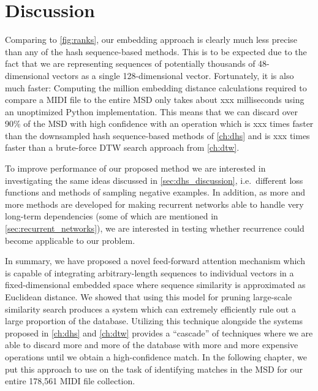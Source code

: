 \section{Discussion}
\label{sec:pse_discussion}

Comparing to \cref{fig:ranks}, our embedding approach is clearly much less precise than any of the hash sequence-based methods.
This is to be expected due to the fact that we are representing sequences of potentially thousands of 48-dimensional vectors as a single 128-dimensional vector.
Fortunately, it is also much faster: Computing the million embedding distance calculations required to compare a MIDI file to the entire MSD only takes about xxx milliseconds using an unoptimized Python implementation.
This means that we can discard over 90\% of the MSD with high confidence with an operation which is xxx times faster than the downsampled hash sequence-based methods of \cref{ch:dhs} and is xxx times faster than a brute-force DTW search approach from \cref{ch:dtw}.

To improve performance of our proposed method we are interested in investigating the same ideas discussed in \cref{sec:dhs_discussion}, i.e.\ different loss functions and methods of sampling negative examples.
In addition, as more and more methods are developed for making recurrent networks able to handle very long-term dependencies (some of which are mentioned in \cref{sec:recurrent_networks}), we are interested in testing whether recurrence could become applicable to our problem.

In summary, we have proposed a novel feed-forward attention mechanism which is capable of integrating arbitrary-length sequences to individual vectors in a fixed-dimensional embedded space where sequence similarity is approximated as Euclidean distance.
We showed that using this model for pruning large-scale similarity search produces a system which can extremely efficiently rule out a large proportion of the database.
Utilizing this technique alongside the systems proposed in \cref{ch:dhs} and \cref{ch:dtw} provides a ``cascade'' of techniques where we are able to discard more and more of the database with more and more expensive operations until we obtain a high-confidence match.
In the following chapter, we put this approach to use on the task of identifying matches in the MSD for our entire 178,561 MIDI file collection.
